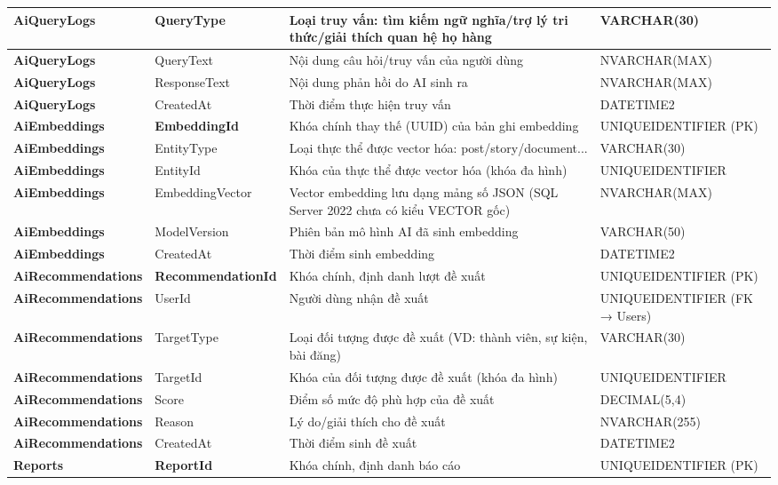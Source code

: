 \begin{longtable}{|p{}|p{}|p{}|p{}|}
\textbf{AiQueryLogs} & QueryType & Loại truy vấn: tìm kiếm ngữ nghĩa/trợ lý tri thức/giải thích quan hệ họ hàng & VARCHAR(30) \\ \hline
\textbf{AiQueryLogs} & QueryText & Nội dung câu hỏi/truy vấn của người dùng & NVARCHAR(MAX) \\ \hline
\textbf{AiQueryLogs} & ResponseText & Nội dung phản hồi do AI sinh ra & NVARCHAR(MAX) \\ \hline
\textbf{AiQueryLogs} & CreatedAt & Thời điểm thực hiện truy vấn & DATETIME2 \\ \hline
\textbf{AiEmbeddings} & \textbf{EmbeddingId} & Khóa chính thay thế (UUID) của bản ghi embedding & UNIQUEIDENTIFIER (PK) \\ \hline
\textbf{AiEmbeddings} & EntityType & Loại thực thể được vector hóa: post/story/document... & VARCHAR(30) \\ \hline
\textbf{AiEmbeddings} & EntityId & Khóa của thực thể được vector hóa (khóa đa hình) & UNIQUEIDENTIFIER \\ \hline
\textbf{AiEmbeddings} & EmbeddingVector & Vector embedding lưu dạng mảng số JSON (SQL Server 2022 chưa có kiểu VECTOR gốc) & NVARCHAR(MAX) \\ \hline
\textbf{AiEmbeddings} & ModelVersion & Phiên bản mô hình AI đã sinh embedding & VARCHAR(50) \\ \hline
\textbf{AiEmbeddings} & CreatedAt & Thời điểm sinh embedding & DATETIME2 \\ \hline
\textbf{AiRecommendations} & \textbf{RecommendationId} & Khóa chính, định danh lượt đề xuất & UNIQUEIDENTIFIER (PK) \\ \hline
\textbf{AiRecommendations} & UserId & Người dùng nhận đề xuất & UNIQUEIDENTIFIER (FK → Users) \\ \hline
\textbf{AiRecommendations} & TargetType & Loại đối tượng được đề xuất (VD: thành viên, sự kiện, bài đăng) & VARCHAR(30) \\ \hline
\textbf{AiRecommendations} & TargetId & Khóa của đối tượng được đề xuất (khóa đa hình) & UNIQUEIDENTIFIER \\ \hline
\textbf{AiRecommendations} & Score & Điểm số mức độ phù hợp của đề xuất & DECIMAL(5,4) \\ \hline
\textbf{AiRecommendations} & Reason & Lý do/giải thích cho đề xuất & NVARCHAR(255) \\ \hline
\textbf{AiRecommendations} & CreatedAt & Thời điểm sinh đề xuất & DATETIME2 \\ \hline
\textbf{Reports} & \textbf{ReportId} & Khóa chính, định danh báo cáo & UNIQUEIDENTIFIER (PK) \\ \hline

\end{longtable}
